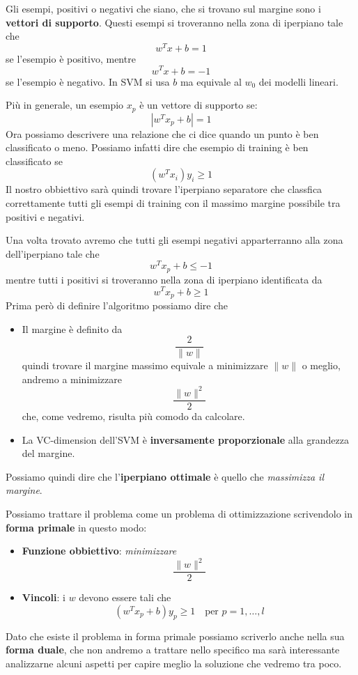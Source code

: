 Gli esempi, positivi o negativi che siano, che si trovano sul margine sono i \textbf{vettori di supporto}. Questi esempi si
troveranno nella zona di iperpiano tale che
\[ w^T x + b = 1 \]
se l'esempio \`e positivo, mentre
\[ w^T x + b = -1 \]
se l'esempio \`e negativo. In SVM si usa $b$ ma equivale al $w_0$ dei modelli lineari.

Pi\`u in generale, un esempio $x_p$ \`e un vettore di supporto se:
\[ | w^T x_p + b | = 1 \]
Ora possiamo descrivere una relazione che ci dice quando un punto \`e ben classificato o meno. Possiamo infatti dire che
esempio di training \`e ben classificato se
\[ (w^T x_i) y_i \geq 1 \]
Il nostro obbiettivo sar\`a quindi trovare l'iperpiano separatore che classfica correttamente tutti gli esempi di training
con il massimo margine possibile tra positivi e negativi.

Una volta trovato avremo che tutti gli esempi negativi apparterranno alla zona dell'iperpiano tale che
\[ w^T x_p + b \leq -1 \]
mentre tutti i positivi si troveranno nella zona di iperpiano identificata da
\[ w^T x_p + b \geq 1 \]
Prima per\`o di definire l'algoritmo possiamo dire che
\begin{itemize}
	\item Il margine \`e definito da
	      \[ \frac{2}{\| w \|} \]
	      quindi trovare il margine massimo equivale a minimizzare $\| w \|$ o meglio, andremo a minimizzare
	      \[\frac{\| w \|^2}{2}\]
	      che, come vedremo, risulta pi\`u comodo da calcolare.
	\item La VC-dimension dell'SVM \`e \textbf{inversamente proporzionale} alla grandezza del margine.
\end{itemize}
Possiamo quindi dire che l'\textbf{iperpiano ottimale} \`e quello che \emph{massimizza il margine}.

Possiamo trattare il problema come un problema di ottimizzazione scrivendolo in \textbf{forma primale} in questo modo:
\begin{itemize}
	\item \textbf{Funzione obbiettivo}: \emph{minimizzare}
	      \[ \frac{\| w \|^2}{2} \]
	\item \textbf{Vincoli}: i $w$ devono essere tali che
	      \[ (w^T x_p + b) y_p \geq 1 \quad \text{per } p = 1, \dots, l \]
\end{itemize}
Dato che esiste il problema in forma primale possiamo scriverlo anche nella sua \textbf{forma duale}, che non andremo a
trattare nello specifico ma sar\`a interessante analizzarne alcuni aspetti per capire meglio la soluzione che vedremo
tra poco.

